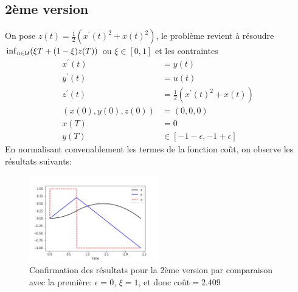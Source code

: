 \documentclass[
	french,
	11pt, %
]{fphw}
\begin{document}
\subsection*{2ème version}
On pose $z(t)= \frac{1}{2} ( x^\prime(t)^2 + x(t)^2) $, le problème revient à résoudre $\inf_{u\in \cal U} (\xi T + (1-\xi)z(T))$ ou $\xi \in [0,1]$ et les contraintes
\begin{align*}
x^\prime (t)&=y(t) \\
y^\prime (t)&=u(t) \\
z^\prime (t)&= \frac{1}{2} (x^{\prime}(t)^2 + x(t)) \\
(x(0),y(0),z(0)) &= (0,0,0) \\
x(T)&=0 \\
y(T) &\in [-1-\epsilon,-1+\epsilon]
\end{align*}
En normalisant convenablement les termes de la fonction coût, on observe les résultats suivants:

\begin{figure}[H]
    \centering
    \includegraphics[width=0.5\textwidth]{Exo2Verif.png}
	\caption{Confirmation des résultats pour la 2ème version par comparaison avec la première: $\epsilon=0$, $\xi = 1$, et donc coût$=2.409$}
	\label{fig:Exo2Verif}
\end{figure}
\end{document}
